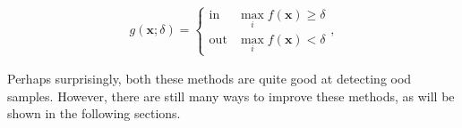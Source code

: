 \documentclass[UKenglish]{uiomasterthesis} %
\theoremstyle{definition}
\begin{document}
\begin{align}
\label{eq:mls}
    g(\bm{x}; \delta)=\begin{cases} 
        \text{in } & \max_i f(\bm{x})\ge \delta \\
        \text{out} & \max_i f(\bm{x}) < \delta 
   \end{cases},
\end{align}

Perhaps surprisingly, both these methods are quite good at detecting \ac{ood} samples. However, there are still many ways to improve these methods, as will be shown in the following sections.
\\

%
%
%
%
%
%
%
\end{document}
